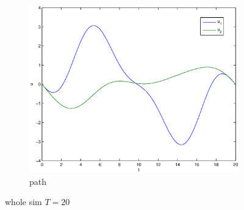 \begin{figure}
\begin{subfigure}[b]{\textwidth}
\centering
\includegraphics[height=0.3\textheight]{img/final_1_1_20_u.eps}
\caption{path}
\end{subfigure}
\caption{whole sim $T=20$}
\end{figure}

